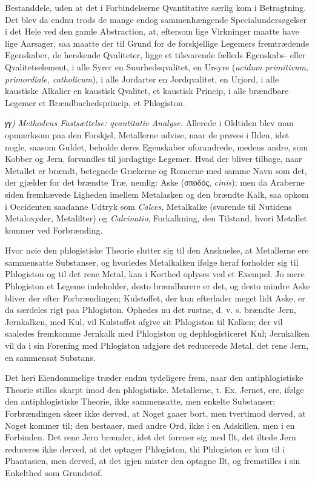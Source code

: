 \documentclass[12pt,a4paper]{book}
\begin{document}
Bestanddele, uden at det i Forbindelserne Qvantitative særlig
kom i Betragtning. Det blev da endnu trods de mange endog
sammenhængende Specialundersøgelser i det Hele ved den gamle
Abstraction, at, eftersom lige Virkninger maatte have lige Aarsager,
saa maatte der til Grund for de forskjellige Legemers fremtrædende
Egenskaber, de herskende Qvaliteter, ligge et tilsvarende fælleds
Egenskabs- eller Qvalitetselement, i alle Syrer en Suurhedsqvalitet,
en Ursyre (\textit{acidum primitivum, primordiale, catholicum}), i
alle Jordarter en Jordqvalitet, en Urjord, i alle kaustiske Alkalier
en kaustisk Qvalitet, et kaustisk Princip, i alle brændbare Legemer
et Brændbarhedsprincip, et Phlogiston.

\emph{γγ) Methodens Fastsættelse: qvantitativ Analyse.}
Allerede i Oldtiden blev man opmærksom paa den Forskjel,
Metallerne udvise, naar de prøves i Ilden, idet nogle, saasom
Guldet, beholde deres Egenskaber uforandrede, medens andre, som
Kobber og Jern, forvandles til jordagtige Legemer. Hvad der bliver
tilbage, naar Metallet er brændt, betegnede Grækerne og Romerne
med samme Navn som det, der gjælder for det brændte Træ,
nemlig: Aske (σποδός, \textit{cinis}); men da Araberne siden
fremhævede Ligheden imellem Metalasken og den brændte Kalk, saa
opkom i Occidenten saadanne Udtryk som \textit{Calces}, Metalkalke
(svarende til Nutidens Metaloxyder, Metalilter) og
\textit{Calcinatio}, Forkalkning, den Tilstand, hvori Metallet kommer
ved Forbrænding.

Hvor nøie den phlogistiske Theorie slutter sig til den Anskuelse,
at Metallerne ere sammensatte Substanser, og hvorledes Metalkalken
ifølge heraf forholder sig til Phlogiston og til det rene Metal, kan
i Korthed oplyses ved et Exempel. Jo mere Phlogiston et Legeme
indeholder, desto brændbarere er det, og desto mindre Aske bliver
der efter Forbrændingen; Kulstoffet, der kun efterlader meget lidt
Aske, er da særdeles rigt paa Phlogiston. Ophedes nu det rustne,
d. v. s. brændte Jern, Jernkalken, med Kul, vil Kulstoffet afgive
sit Phlogiston
til Kalken; der vil saaledes fremkomme Jernkalk med Phlogiston og
dephlogisticeret Kul; Jernkalken vil da i sin Forening med
Phlogiston udgjøre det reducerede Metal, det rene Jern, en
sammensat Substans.

Det heri Eiendommelige træder endnu tydeligere frem, naar den
antiphlogistiske Theorie stilles skarpt imod den phlogistiske.
Metallerne, t. Ex. Jernet, ere, ifølge den antiphlogistiske
Theorie, ikke sammensatte, men enkelte Substanser; Forbrændingen
skeer ikke derved, at Noget gaaer bort, men tvertimod derved, at
Noget kommer til; den bestaaer, med andre Ord, ikke i en Adskillen,
men i en Forbinden. Det rene Jern brænder, idet det forener sig med
Ilt, det iltede Jern reduceres ikke derved, at det optager
Phlogiston, thi Phlogiston er kun til i Phantasien, men derved, at
det igjen mister den optagne Ilt, og fremstilles i sin Enkelthed
som Grundstof.
\end{document}
